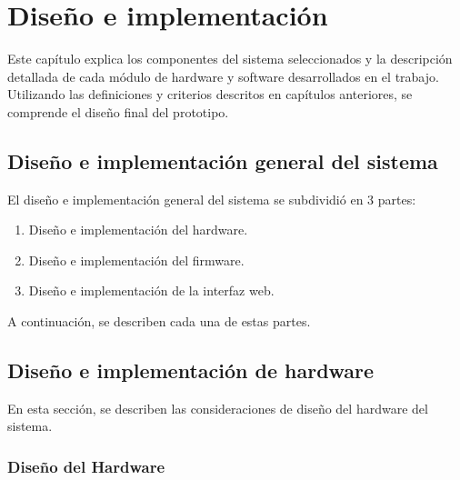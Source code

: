 \chapter{Diseño e implementación} %

\label{Chapter3} %


Este capítulo explica los componentes del sistema seleccionados y la descripción detallada de cada módulo de hardware y software desarrollados en el trabajo. Utilizando las definiciones y criterios descritos en capítulos anteriores, se comprende el diseño final del prototipo.

\section{Diseño e implementación general del sistema}

El diseño e implementación general del sistema se subdividió en 3 partes: 

\begin{enumerate}
    \item Diseño e implementación del hardware.
    \item Diseño e implementación del firmware.
    \item Diseño e implementación de la interfaz web.
\end{enumerate}

A continuación, se describen cada una de estas partes.

\section{Diseño e implementación de hardware}
\label{sec:dis_impl_hardware}

En esta sección, se describen las consideraciones de diseño del hardware del sistema. 

\subsection{Diseño del Hardware}

